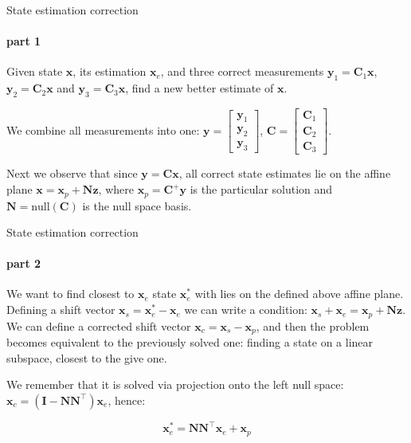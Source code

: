 \documentclass{beamer}
\begin{document}
\begin{frame}{State estimation correction}
\framesubtitle{part 1}
\begin{flushleft}

Given state $\mathbf{x}$, its estimation $\mathbf{x}_e$, and three correct measurements $\mathbf{y}_1 = \mathbf{C}_1 \mathbf{x}$, $\mathbf{y}_2 = \mathbf{C}_2 \mathbf{x}$ and $\mathbf{y}_3 = \mathbf{C}_3 \mathbf{x}$, find a new better estimate of $\mathbf{x}$.

\bigskip

We combine all measurements into one: $\mathbf{y} = \begin{bmatrix} \mathbf{y}_1 \\ \mathbf{y}_2 \\ \mathbf{y}_3 \end{bmatrix}$, $\mathbf{C} = \begin{bmatrix} \mathbf{C}_1 \\ \mathbf{C}_2 \\ \mathbf{C}_3 \end{bmatrix}$.

Next we observe that since $\mathbf{y} = \mathbf{C} \mathbf{x}$, all correct state estimates lie on the affine plane $\mathbf{x} = \mathbf{x}_p + \mathbf{N}\mathbf{z}$, where $\mathbf{x}_p = \mathbf{C}^+\mathbf{y}$ is the particular solution and $\mathbf{N} =  \text{null}(\mathbf{C})$ is the null space basis.


\end{flushleft}
\end{frame}




\begin{frame}{State estimation correction}
\framesubtitle{part 2}
\begin{flushleft}

We want to find closest to $\mathbf{x}_e$ state $\mathbf{x}^*_e$ with lies on the defined above affine plane. Defining a shift vector $\mathbf{x}_s = \mathbf{x}^*_e - \mathbf{x}_e$ we can write a condition: $\mathbf{x}_s + \mathbf{x}_e = \mathbf{x}_p + \mathbf{N}\mathbf{z}$. We can define a corrected shift vector $\mathbf{x}_c = \mathbf{x}_s - \mathbf{x}_p$, and then the problem becomes equivalent to the previously solved one: finding a state on a linear subspace, closest to the give one. 

\bigskip 

We remember that it is solved via projection onto the left null space: $\mathbf{x}_c = (\mathbf{I} - \mathbf{N}\mathbf{N}^{\top})\mathbf{x}_e$, hence:

\begin{equation}
    \mathbf{x}^*_e = \mathbf{N}\mathbf{N}^{\top}\mathbf{x}_e + \mathbf{x}_p
\end{equation}


\end{flushleft}
\end{frame}
\end{document}
